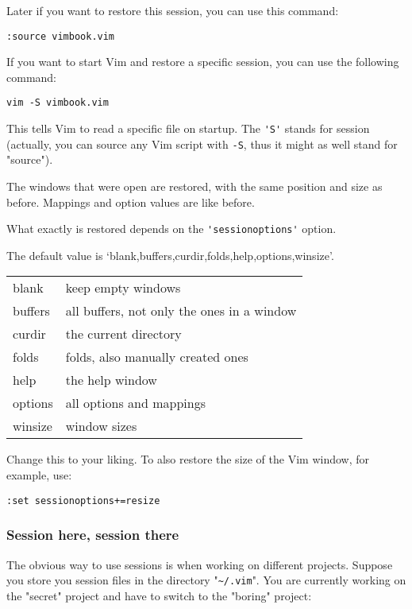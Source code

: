 Later if you want to restore this session, you can use this command:

\begin{Verbatim}[samepage=true]
 :source vimbook.vim
\end{Verbatim}

If you want to start Vim and restore a specific session, you can use the following command:

\begin{Verbatim}[samepage=true]
 vim -S vimbook.vim
\end{Verbatim}

This tells Vim to read a specific file on startup.
The \verb!'S'! stands for session (actually, you can source any Vim script with \verb!-S!, thus it might as well stand for "source").

The windows that were open are restored, with the same position and size as before.
Mappings and option values are like before.

What exactly is restored depends on the \verb!'sessionoptions'! option.

The default value is `blank,buffers,curdir,folds,help,options,winsize'.

\begin{center} \begin{tabular}{l l}
				blank & keep empty windows \\
				buffers & all buffers, not only the ones in a window \\
				curdir & the current directory \\
				folds & folds, also manually created ones \\
				help & the help window \\
				options & all options and mappings \\
				winsize & window sizes \\
\end{tabular} \end{center}
Change this to your liking.
To also restore the size of the Vim window, for example, use:

\begin{Verbatim}[samepage=true]
 :set sessionoptions+=resize
\end{Verbatim}
\subsubsection{Session here, session there}
The obvious way to use sessions is when working on different projects.
Suppose you store you session files in the directory "\verb!~/.vim!".
You are currently working on the "secret" project and have to switch to the "boring" project:

